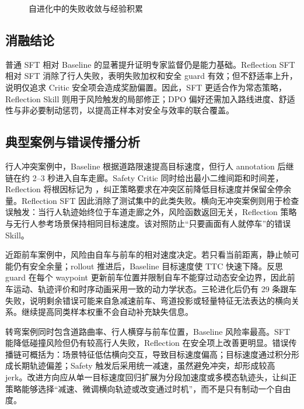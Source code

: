 \documentclass[UTF8,a4paper,12pt,fontset=fandol]{ctexart}
\begin{document}
\begin{figure}[!htbp]
\centering
{}
\caption{自进化中的失败收敛与经验积累}
\end{figure}

\subsection{消融结论}
普通 SFT 相对 Baseline 的显著提升证明专家监督仍是能力基础。Reflection SFT 相对 SFT 消除了行人失败，表明失败加权和安全 guard 有效；但不舒适率上升，说明仅追求 Critic 安全项会造成奖励偏置。因此，SFT 更适合作为常态策略，Reflection Skill 则用于风险触发的局部修正；DPO 偏好还需加入路线进度、舒适性与非必要制动惩罚，以提高正样本对安全与效率的联合覆盖。

\subsection{典型案例与错误传播分析}
行人冲突案例中，Baseline 根据道路限速提高目标速度，但行人 annotation 后继链在约 2--3 秒进入自车走廊。Safety Critic 同时给出最小二维间距和时间差，Reflection 将根因标记为 ，纠正策略要求在冲突区前降低目标速度并保留全停余量。Reflection SFT 因此消除了测试集中的此类失败。横向无冲突案例则用于检查误触发：当行人轨迹始终位于车道走廊之外，风险函数返回无关，Reflection 策略与无行人参考场景保持相同目标速度。该对照防止“只要画面有人就停车”的错误 Skill。

近距前车案例中，风险由自车与前车的相对速度决定。若只看当前距离，静止帧可能仍有安全余量；rollout 推进后，Baseline 目标速度使 TTC 快速下降。反思 guard 在每个 waypoint 更新前车位置并限制自车不能穿过动态安全边界，因此前车运动、轨迹评价和时序动画采用一致的动力学状态。三轮进化后仍有 29 条跟车失败，说明剩余错误可能来自急减速前车、弯道投影或轻量特征无法表达的横向关系。继续提高同类样本权重不会自动补充缺失信息。

转弯案例同时包含道路曲率、行人横穿与前车位置，Baseline 风险率最高。SFT 能降低碰撞风险但仍有较高行人失败，Reflection 在安全项上改善更明显。错误传播链可概括为：场景特征低估横向交互，导致目标速度偏高；目标速度通过积分形成长期轨迹偏差；Safety 触发后采用统一减速，虽然避免冲突，却形成较高 jerk。改进方向应从单一目标速度回归扩展为分段加速度或多模态轨迹头，让纠正策略能够选择“减速、微调横向轨迹或改变通过时机”，而不是只有制动一个自由度。
\end{document}
